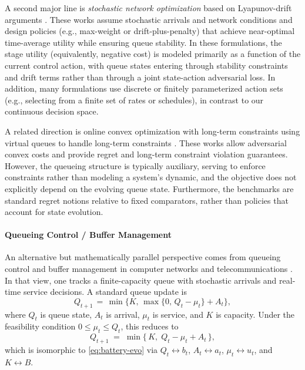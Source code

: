 \documentclass[11pt]{article}
\begin{document}
A second major line is \emph{stochastic network optimization} based on Lyapunov-drift arguments \cite{neely2010stochastic, georgiadis2006resource}. These works assume stochastic arrivals and network conditions and design policies (e.g., max-weight or drift-plus-penalty) that achieve near-optimal time-average utility while ensuring queue stability. In these formulations, the stage utility (equivalently, negative cost) is modeled primarily as a function of the current control action, with queue states entering through stability constraints and drift terms rather than through a joint state-action adversarial loss. In addition, many formulations use discrete or finitely parameterized action sets (e.g., selecting from a finite set of rates or schedules), in contrast to our continuous decision space.

A related direction is online convex optimization with long-term constraints using virtual queues to handle long-term constraints \cite{mahdavi2012trading, jenatton2016adaptive, yu2017online, JMLR:v21:16-494}. These works allow adversarial convex costs and provide regret and long-term constraint violation guarantees. However, the queueing structure is typically auxiliary, serving to enforce constraints rather than modeling a system's dynamic, and the objective does not explicitly depend on the evolving queue state. Furthermore, the benchmarks are standard regret notions relative to fixed comparators, rather than policies that account for state evolution.




\paragraph{Queueing Control / Buffer Management}

An alternative but mathematically parallel perspective comes from queueing control and buffer management in computer networks and telecommunications \cite{kleinrock1975queueing,leboudec2001network}. In that view, one tracks a finite-capacity queue with stochastic arrivals and real-time service decisions. A standard queue update is
\[
Q_{t+1} \,=\, \min\!\bigl\{K,\,\max\{0,\,Q_t-\mu_t\}+A_t\bigr\},
\]
where \(Q_t\) is queue state, \(A_t\) is arrival, \(\mu_t\) is service, and \(K\) is capacity. Under the feasibility condition \(0\le \mu_t\le Q_t\), this reduces to
\begin{equation*}
Q_{t+1} \;=\; \min\{\,K,\; Q_t-\mu_t+A_t\,\},
\end{equation*}
which is isomorphic to \eqref{eq:battery-evo} via \(Q_t\leftrightarrow b_t\), \(A_t\leftrightarrow a_t\), \(\mu_t\leftrightarrow u_t\), and \(K\leftrightarrow B\).
\end{document}
